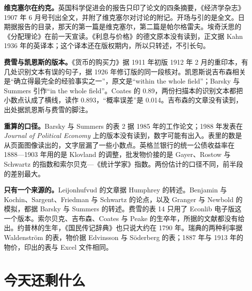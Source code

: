 \begin{deeper}[史料说明]
\textbf{维克塞尔在约克。}英国科学促进会的报告只印了论文的四条摘要，《经济学杂志》1907 年 6 月号刊出全文，并附了维克塞尔对讨论的附记\cite{baas1907,wicksell1907}。开场与引的是全文。日期据报告的目录，那天的第一篇是维克塞尔，第二篇是帕尔格雷夫。埃奇沃思的《分配理论》在前一天宣读\cite{baas1907}。《利息与价格》的德文原本没有读到，正文据 Kahn 1936 年的英译本；这个译本还在版权期内，所以只转述，不引长句。

\textbf{费雪与凯恩斯的版本。}《货币的购买力》据 1911 年初版 1912 年 2 月的重印本，有几处识别文本有误的句子，据 1926 年修订版的同一段核对\cite{fisher1911}。凯恩斯说吉布森相关是“确立得最完全的经验事实之一”，原文是“within the whole field”；Barsky 与 Summers 引作“in the whole field”\cite{keynes1930,barsky1985}。Coates 的 0.89，两份扫描本的识别文本都把小数点认成了横线，读作 0.893，“概率误差”是 0.014\cite{keynes1930}。吉布森的文章没有读到，出处据凯恩斯与费雪的脚注。

\textbf{重算的口径。}Barsky 与 Summers 的表 2 据 1985 年的工作论文；1988 年发表在 \emph{Journal of Political Economy} 上的版本没有读到，数字可能有出入\cite{barsky1985}。表里的数是从页面图像读出的，文字层漏了一些小数点。英格兰银行的统一公债收益率在 1888—1903 年用的是 Klovland 的调整，批发物价接的是 Gayer、Rostow 与 Schwartz 的指数和索尔贝克—《统计学家》指数\cite{boe2017}。两份估计的口径不同，前半段的差别最大。

\textbf{只有一个来源的。}Leijonhufvud 的文章据 Humphrey 的转述。Benjamin 与 Kochin、Sargent、Friedman 与 Schwartz 的论点，以及 Granger 与 Newbold 的模拟，都据 Barsky 与 Summers 的转述。费雪的表 14 只用了 Econlib 电子版这一个版本\cite{fisher1930}。索尔贝克、吉布森、Coates 与 Peake 的生卒年，所据的文献都没有给出。约普林的生年，《国民传记辞典》也只说大约在 1790 年\cite{watt1892}。瑞典的两种利率据 Waldenström 的表，物价据 Edvinsson 与 Söderberg 的表；1887 年与 1913 年的物价，印出的表与 Excel 文件相同\cite{edvinsson2010b}。
\end{deeper}

\section{今天还剩什么}\label{sec:wicksell-legacy}

